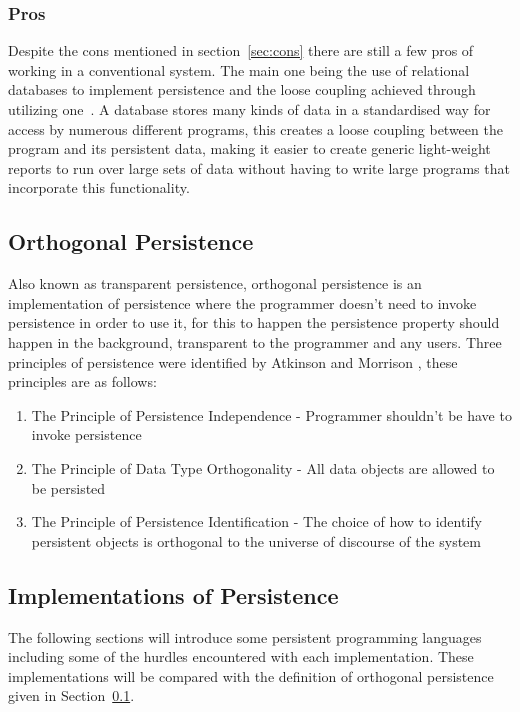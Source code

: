 \documentclass[a4paper,12pt]{article}
\begin{document}
\subsubsection{Pros}
Despite the cons mentioned in section~\ref{sec:cons} there are still a few pros of working in a conventional system. The main one being the use of relational databases to implement persistence and the loose coupling achieved through utilizing one~\citep{Databases}.
A database stores many kinds of data in a standardised way for access by numerous different programs, this creates a loose coupling between the program and its persistent data, making it easier to create generic light-weight reports to run over large sets of data without having to write large programs that incorporate this functionality.
\subsection{Orthogonal Persistence}\label{sec:orthogonal}
Also known as transparent persistence, orthogonal persistence is an implementation of persistence where the programmer doesn't need to invoke persistence in order to use it, for this to happen the persistence property should happen in the background, transparent to the programmer and any users.
Three principles of persistence were identified by Atkinson and Morrison \citep{Atkinson}, these principles are as follows:
\begin{enumerate}
    \item{The Principle of Persistence Independence - Programmer shouldn't be have to invoke persistence}
    \item{The Principle of Data Type Orthogonality - All data objects are allowed to be persisted}
    \item{The Principle of Persistence Identification - The choice of how to identify persistent objects is orthogonal to the universe of discourse of the system}
\end{enumerate}
\subsection{Implementations of Persistence}\label{sec:persistentLanguages}
The following sections will introduce some persistent programming languages including some of the hurdles encountered with each implementation. These implementations will be compared with the definition of orthogonal persistence given in Section~\ref{sec:orthogonal}.
\end{document}
